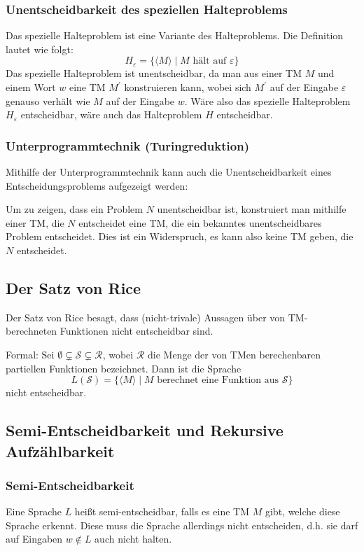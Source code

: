 \documentclass[a4paper,parskip=half*,DIV=7,fontsize=11pt]{scrartcl}
\begin{document}
\subsubsection{Unentscheidbarkeit des speziellen Halteproblems}
Das spezielle Halteproblem ist eine Variante des Halteproblems. Die Definition lautet wie folgt:
\[
H_\varepsilon = \{ \langle M \rangle \mid M \text{ hält auf }\varepsilon \}
\]
Das spezielle Halteproblem ist unentscheidbar, da man aus einer TM $M$ und einem Wort $w$ eine TM $M^\prime$ konstruieren kann, wobei sich $M^\prime$ auf der Eingabe $\varepsilon$ genauso verhält wie $M$ auf der Eingabe $w$. Wäre also das spezielle Halteproblem $H_\varepsilon$ entscheidbar, wäre auch das Halteproblem $H$ entscheidbar.
\subsubsection{Unterprogrammtechnik (Turingreduktion)}
Mithilfe der Unterprogrammtechnik kann auch die  Unentscheidbarkeit eines Entscheidungsproblems aufgezeigt werden:

Um zu zeigen, dass ein Problem $N$ unentscheidbar ist, konstruiert man mithilfe einer TM, die $N$ entscheidet eine TM, die ein bekanntes unentscheidbares Problem entscheidet. Dies ist ein Widerspruch, es kann also keine TM geben, die $N$ entscheidet.

\subsection{Der Satz von Rice}
Der Satz von Rice besagt, dass (nicht-trivale) Aussagen über von TM-berechneten Funktionen nicht entscheidbar sind.

Formal: Sei $\emptyset \varsubsetneq \mathcal S \varsubsetneq \mathcal R$, wobei $\mathcal R$ die  Menge der von TMen berechenbaren partiellen Funktionen bezeichnet.  Dann ist die Sprache 
\[L(\mathcal S ) = \{\langle M \rangle \mid \text{$M$ berechnet eine Funktion aus $\mathcal S$}\}\]
nicht entscheidbar. 

\subsection{Semi-Entscheidbarkeit und Rekursive Aufzählbarkeit}
\subsubsection{Semi-Entscheidbarkeit}
Eine Sprache $L$ heißt semi-entscheidbar, falls es eine TM  $M$ gibt, welche diese Sprache erkennt. Diese muss die Sprache allerdings nicht entscheiden, d.h. sie darf auf Eingaben $w \notin L$ auch nicht halten.
\end{document}
